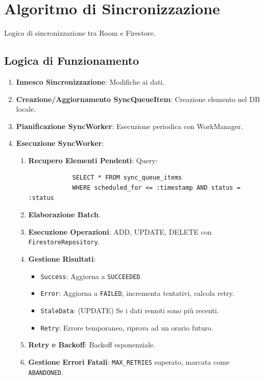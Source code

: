 \documentclass{article}
\begin{document}
\section{Algoritmo di Sincronizzazione}\label{sec:algoritmo-di-sincronizzazione}
Logica di sincronizzazione tra Room e Firestore.

\subsection{Logica di Funzionamento}\label{subsec:logica-di-funzionamento}
\begin{enumerate}
    \item \textbf{Innesco Sincronizzazione}: Modifiche ai dati.
    \item \textbf{Creazione/Aggiornamento SyncQueueItem}: Creazione elemento nel
    DB locale.
    \item \textbf{Pianificazione SyncWorker}: Esecuzione periodica con
    WorkManager.
    \item \textbf{Esecuzione SyncWorker}:
        \begin{enumerate}
            \item \textbf{Recupero Elementi Pendenti}: Query:
            \begin{verbatim}
            SELECT * FROM sync_queue_items
            WHERE scheduled_for <= :timestamp AND status = :status
            \end{verbatim}
            \item \textbf{Elaborazione Batch}.
            \item \textbf{Esecuzione Operazioni}: ADD, UPDATE, DELETE con
            \texttt{FirestoreRepository}.
            \item \textbf{Gestione Risultati}:
            \begin{itemize}
                \item \texttt{Success}: Aggiorna a \texttt{SUCCEEDED}.
                \item \texttt{Error}: Aggiorna a \texttt{FAILED}, incrementa
                tentativi, calcola retry.
                \item \texttt{StaleData}: (UPDATE) Se i dati remoti sono più
                recenti.
                \item \texttt{Retry}: Errore temporaneo, riprova ad un orario
                futuro.
            \end{itemize}
            \item \textbf{Retry e Backoff}: Backoff esponenziale.
            \item \textbf{Gestione Errori Fatali}: \texttt{MAX\_RETRIES}
            superato, marcata come \texttt{ABANDONED}.
        \end{enumerate}
\end{enumerate}
\end{document}
